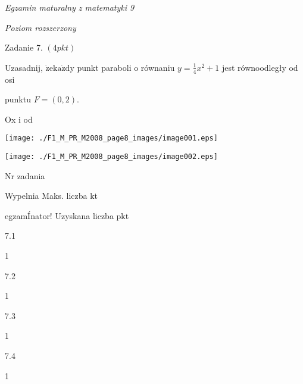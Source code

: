 \documentclass[a4paper,12pt]{article}
\begin{document}
{\it Egzamin maturalny z matematyki 9}

{\it Poziom rozszerzony}

Zadanie 7. $(4pkt)$

Uzasadnij, $\dot{\mathrm{z}}\mathrm{e}\mathrm{k}\mathrm{a}\dot{\mathrm{z}}\mathrm{d}\mathrm{y}$ punkt paraboli o równaniu $y=\displaystyle \frac{1}{4}x^{2}+1$ jest równoodległy od osi

punktu $F=(0,2).$

Ox i od
\begin{center}
\texttt{[image: ./F1\_M\_PR\_M2008\_page8\_images/image001.eps]}

\texttt{[image: ./F1\_M\_PR\_M2008\_page8\_images/image002.eps]}
\end{center}
Nr zadania

Wypelnia Maks. liczba kt

egzamÍnator! Uzyskana liczba pkt

7.1

1

7.2

1

7.3

1

7.4

1
\end{document}
